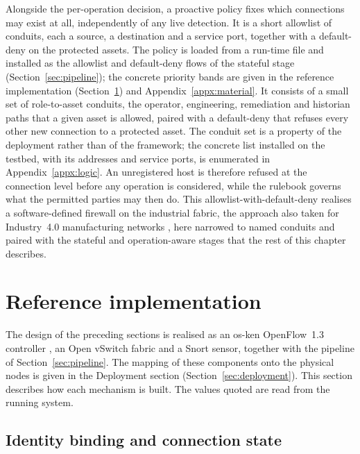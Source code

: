 Alongside the per-operation decision, a proactive policy fixes which connections may exist at all, independently of any live detection. It is a short allowlist of conduits, each a source, a destination and a service port, together with a default-deny on the protected assets. The policy is loaded from a run-time file and installed as the allowlist and default-deny flows of the stateful stage (Section~\ref{sec:pipeline}); the concrete priority bands are given in the reference implementation (Section~\ref{sec:implementation}) and Appendix~\ref{appx:material}. It consists of a small set of role-to-asset conduits, the operator, engineering, remediation and historian paths that a given asset is allowed, paired with a default-deny that refuses every other new connection to a protected asset. The conduit set is a property of the deployment rather than of the framework; the concrete list installed on the testbed, with its addresses and service ports, is enumerated in Appendix~\ref{appx:logic}. An unregistered host is therefore refused at the connection level before any operation is considered, while the rulebook governs what the permitted parties may then do. This allowlist-with-default-deny realises a software-defined firewall on the industrial fabric, the approach also taken for Industry~4.0 manufacturing networks \cite{tsuchiya2018firewall}, here narrowed to named conduits and paired with the stateful and operation-aware stages that the rest of this chapter describes.

\section{Reference implementation}
\label{sec:implementation}

The design of the preceding sections is realised as an os-ken OpenFlow~1.3 controller \cite{onf2012openflow13}, an Open vSwitch fabric and a Snort sensor, together with the pipeline of Section~\ref{sec:pipeline}. The mapping of these components onto the physical nodes is given in the Deployment section (Section~\ref{sec:deployment}). This section describes how each mechanism is built. The values quoted are read from the running system.

\subsection{Identity binding and connection state}


